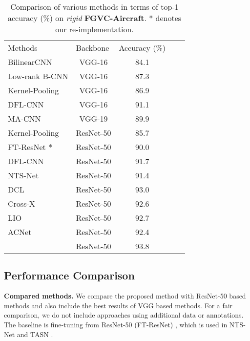 \documentclass[journal]{IEEEtran}
\begin{document}
\setlength{\tabcolsep}{8pt}
\begin{table}[t]
\caption{Comparison of various methods in terms of top-1 accuracy (\%) on \emph{rigid} \textbf{FGVC-Aircraft}. * denotes our re-implementation.}
\small
\begin{center}
\begin{tabular}{|l|c|c|c|c|}
\hline
\multicolumn{1}{|l|}{\multirow{2}{*}{Methods}}& \multicolumn{1}{l|}{\multirow{2}{*}{Backbone}}& \multicolumn{1}{l|}{\multirow{2}{*}{Accuracy (\%)}}\\
\multicolumn{1}{|c|}{} & {}  &\\
\hline\hline
BilinearCNN \cite{LinRM18} & VGG-16 & 84.1  \\
Low-rank B-CNN \cite{kong2017low}& VGG-16& 87.3 \\
Kernel-Pooling \cite{cui2017kernel}&VGG-16& 86.9  \\
DFL-CNN \cite{wang2018learning}&VGG-16&91.1 \\
\hline
MA-CNN \cite{zheng2017learning}& VGG-19& 89.9 \\
\hline
Kernel-Pooling \cite{cui2017kernel}&ResNet-50& 85.7 \\
FT-ResNet \cite{he2016deep}* & ResNet-50 &90.0 \\
DFL-CNN \cite{wang2018learning}& ResNet-50& 91.7 \\
NTS-Net \cite{yang2018learning} & ResNet-50& 91.4 \\
DCL \cite{Chen_2019_CVPR} & ResNet-50 &93.0   \\
Cross-X \cite{luo2019cross} & ResNet-50 & 92.6 \\
LIO \cite{Zhou_2020_CVPR} & ResNet-50 &92.7 \\
ACNet \cite{ji2020attention} & ResNet-50 &92.4 \\
\hline
\rowcolor{mygray}{CMN (ours)} & ResNet-50  &  {93.8} \\
\hline
\end{tabular}
\end{center}
\label{tab2}
\end{table}


\subsection{Performance Comparison}
\textbf{Compared methods.} We compare the proposed method with ResNet-50 based methods and also include the best results of VGG based methods. For a fair comparison, we do not include approaches using additional data or annotations. The baseline is fine-tuning from ResNet-50 (FT-ResNet) \cite{he2016deep}, which is used in NTS-Net \cite{yang2018learning} and TASN \cite{zheng2019looking}.
\end{document}
